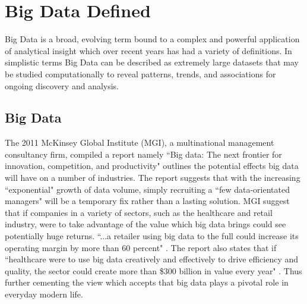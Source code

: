 \chapter{Big Data Defined}
Big Data is a broad, evolving term bound to a complex and powerful application of analytical insight which over recent years has had a variety of definitions. In simplistic terms Big Data can be described as extremely large datasets that may be studied computationally to reveal patterns, trends, and associations for ongoing discovery and analysis.

\section{Big Data}\label{bigdata}

The 2011 McKinsey Global Institute (MGI), a multinational management consultancy firm, compiled a report namely ``Big data: The next frontier for innovation, competition, and productivity" outlines the potential effects big data will have on a number of industries. The report suggests that with the increasing ``exponential" growth of data volume, simply recruiting a ``few data-orientated managers" will be a temporary fix rather than a lasting solution. MGI suggest that if companies in a variety of sectors, such as the healthcare and retail industry, were to take advantage of the value which big data brings could see potentially huge returns. ``...a retailer using big data to the full could increase its operating margin by more than 60 percent" \cite{mckinskey}. The report also states that if ``healthcare were to use big data creatively and effectively to drive efficiency and quality, the sector could create more than \$300 billion in value every year" \cite{mckinskey}. Thus further cementing the view which accepts that big data plays a pivotal role in everyday modern life.

